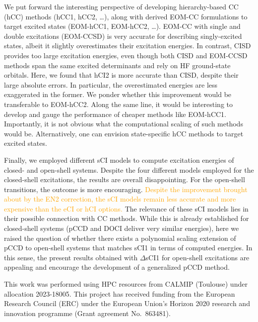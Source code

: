 \documentclass[aip,jcp,reprint,noshowkeys,superscriptaddress]{revtex4-1}
\newcommand{\fk}[1]{\textcolor{orange}{#1}}
\begin{document}
We put forward the interesting perspective of developing hierarchy-based CC (hCC) methods (hCC1, hCC2, \ldots),
along with derived EOM-CC formulations to target excited states (EOM-hCC1, EOM-hCC2, \ldots).
EOM-CC with single and double excitations (EOM-CCSD) \cite{Rowe_1968,Monkhorst_1977,Koch_1990,Stanton_1993}
is very accurate for describing singly-excited states, \cite{Loos_2018,Loos_2020,Loos_2020a} albeit it slightly overestimates their excitation energies.
In contrast, CISD provides too large excitation energies, \cite{Koch_1990,Kossoski_2023}
even though both CISD and EOM-CCSD methods span the same excited determinants and rely on HF ground-state orbitals.
Here, we found that hCI2 is more accurate than CISD, despite their large absolute errors. In particular, the overestimated energies are less exaggerated in the former.
We ponder whether this improvement would be transferable to EOM-hCC2.
Along the same line, it would be interesting to develop and gauge the performance of cheaper methods like EOM-hCC1.
Importantly, it is not obvious what the computational scaling of such methods would be.
Alternatively, one can envision state-specific hCC methods to target excited states.

Finally, we employed different sCI models to compute excitation energies of closed- and open-shell systems.
Despite the four different models employed for the closed-shell excitations, the results are overall disappointing.
For the open-shell transitions, the outcome is more encouraging.
\fk{Despite the improvement brought about by the EN2 correction, the sCI models remain less accurate and more expensive than the eCI or hCI options.}
The relevance of these sCI models lies in their possible connection with CC methods.
While this is already established for closed-shell systems (pCCD and DOCI deliver very similar energies), \cite{Bytautas_2011,Allen_1962,Smith_1965,Veillard_1967,Kossoski_2021,Marie_2021}
here we raised the question of whether there exists a polynomial scaling extension of pCCD to open-shell systems that matches sCI1 in terms of computed energies.
In this sense, the present results obtained with $\Delta$sCI1 for open-shell excitations are appealing and encourage the development of a generalized pCCD method.

\begin{acknowledgements}
This work was performed using HPC resources from CALMIP (Toulouse) under allocation 2023-18005.
This project has received funding from the European Research Council (ERC) under the European Union's Horizon 2020 research and innovation programme (Grant agreement No.~863481).
\end{acknowledgements}
\end{document}
